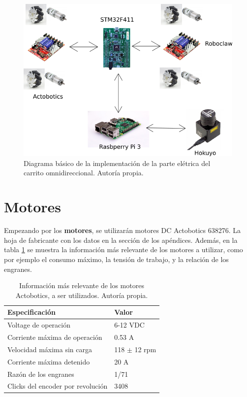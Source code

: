 \begin{figure}[H]
\centering
\includegraphics[scale=0.6]{imagenes/diagrama_diseno.png}
\caption{Diagrama básico de la implementación de la parte elétrica del carrito omnidireccional. Autoría propia.}
\label{F:diagrama}
\end{figure}

\section{Motores}

Empezando por los \textbf{motores}, se utilizarán motores DC Actobotics 638276. La hoja de fabricante con los datos en la sección de los apéndices. Además, en la tabla \ref{T:actobotics} se muestra la información más relevante de los motores a utilizar, como por ejemplo el consumo máximo, la tensión de trabajo, y la relación de los engranes.

\begin{table}[H]
\caption{Información más relevante de los motores Actobotics, a ser utilizados. Autoría propia.}
\begin{tabular}{|l|l|}
\hline
Especificación                & Valor         \\ \hline
Voltage de operación          & 6-12 VDC      \\ \hline
Corriente máxima de operación & 0.53 A        \\ \hline
Velocidad máxima sin carga    & 118 $\pm$ 12 rpm \\ \hline
Corriente máxima detenido     & 20 A          \\ \hline
Razón de los engranes         & 1/71          \\ \hline
Clicks del encoder por revolución & 3408      \\ \hline
\end{tabular}
\label{T:actobotics}
\end{table}

